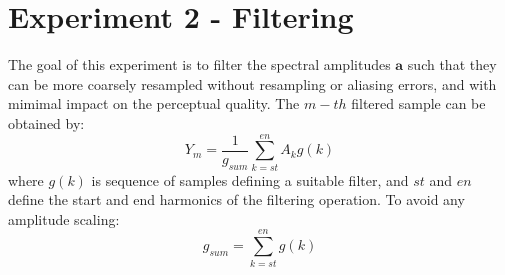 \documentclass{article}
\begin{document}
\section{Experiment 2 - Filtering}

The goal of this experiment is to filter the spectral amplitudes $\mathbf{a}$ such that they can be more coarsely resampled without resampling or aliasing errors, and with mimimal impact on the perceptual quality.
The $m-th$ filtered sample can be obtained by:
\begin{equation}
Y_m = \frac{1}{g_{sum}}\sum_{k=st}^{en}A_k g(k)
\end{equation}
where $g(k)$ is sequence of samples defining a suitable filter, and $st$ and $en$ define the start and end harmonics of the filtering operation.  To avoid any amplitude scaling:
\begin{equation}
g_{sum}=\sum_{k=st}^{en}g(k)
\end{equation}
\end{document}
